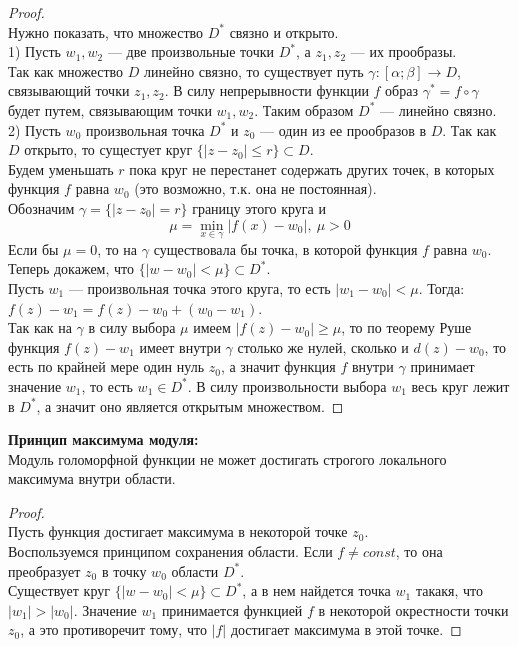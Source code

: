 \begin{proof}
    \ \\
    Нужно показать, что множество $D^*$ связно и открыто.\\
    1) Пусть $w_1, w_2$ --- две произвольные точки $D^*$, а $z_1, z_2$ --- их прообразы.\\
    Так как множество $D$ линейно связно, то существует путь $\gamma: [\alpha; \beta]\rightarrow D$, связывающий точки $z_1, z_2$. В силу непрерывности функции $f$ образ $\gamma^*=f\circ \gamma$ будет путем, связывающим точки $w_1, w_2$. Таким образом $D^*$ --- линейно связно.\\[2mm]
    2) Пусть $w_0$ произвольная точка $D^*$ и $z_0$ --- один из ее прообразов в $D$. Так как $D$ открыто, то сущестует круг $\{|z-z_0|\leq r\}\subset D$. \\
    Будем уменьшать $r$ пока круг не перестанет содержать других точек, в которых функция $f$ равна $w_0$ (это возможно, т.к. она не постоянная).\\
    Обозначим $\gamma=\{|z-z_0|=r\}$ границу этого круга и
    $$\mu=\underset{x\in \gamma}{\min}|f(x)-w_0|, \ \mu>0$$
    Если бы $\mu =0$, то на $\gamma$ существовала бы точка, в которой функция $f$ равна $w_0$.\\[2mm]
    Теперь докажем, что $\{|w-w_0|<\mu\} \subset D^*$.\\
    Пусть $w_1$ --- произвольная точка этого круга, то есть $|w_1-w_0|<\mu$. Тогда:\\
    $f(z)-w_1=f(z)-w_0+(w_0-w_1)$.\\
    Так как на $\gamma$ в силу выбора $\mu$ имеем $|f(z)-w_0|\geq \mu$, то по теорему Руше функция $f(z)-w_1$ имеет внутри $\gamma$ столько же нулей, сколько и $d(z)-w_0$, то есть по крайней мере один нуль $z_0$, а значит функция $f$ внутри $\gamma$ принимает значение $w_1$, то есть $w_1 \in D^*$. В силу произвольности выбора $w_1$ весь круг лежит в $D^*$, а значит оно является открытым множеством.
\end{proof}


\textbf{Принцип максимума модуля:}\\[2mm]
Модуль голоморфной функции не может достигать строгого локального максимума внутри области.\\[2mm]
\begin{proof}
    \ \\
    Пусть функция достигает максимума в некоторой точке $z_0$.\\
    Воспользуемся принципом сохранения области. Если $f\neq const$, то она преобразует $z_0$ в точку $w_0$ области $D^*$. \\
    Существует круг $\{|w-w_0|<\mu\}\subset D^*$, а в нем найдется точка $w_1$ такакя, что  $|w_1|> |w_0|$. Значение $w_1$ принимается функцией $f$ в некоторой окрестности точки $z_0$, а это противоречит тому, что $|f|$ достигает максимума в этой точке.
\end{proof}